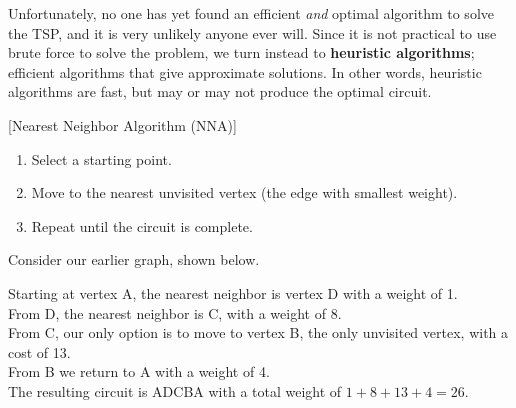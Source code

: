 Unfortunately, no one has yet found an efficient \textit{and} optimal algorithm to solve the TSP, and it is very unlikely anyone ever will.  Since it is not practical to use brute force to solve the problem, we turn instead to \textbf{heuristic algorithms}; efficient algorithms that give approximate solutions.  In other words, heuristic algorithms are fast, but may or may not produce the optimal circuit.

\begin{algorithm}{}{}[Nearest Neighbor Algorithm (NNA)]
\hspace{3in}
\begin{enumerate}
\item	Select a starting point.
\item	Move to the nearest unvisited vertex (the edge with smallest weight).
\item	Repeat until the circuit is complete.
\end{enumerate}
\end{algorithm}

\begin{example}\label{graph17_ex} %
Consider our earlier graph, shown below.  

\begin{center}
\end{center}
\noindent Starting at vertex A, the nearest neighbor is vertex D with a weight of 1.\\
From D, the nearest neighbor is C, with a weight of 8.  \\
From C, our only option is to move to vertex B, the only unvisited vertex, with a cost of 13.  \\
From B we return to A with a weight of 4.  \\

\noindent The resulting circuit is ADCBA with a total weight of $1+8+13+4 = 26$.
\end{example}

